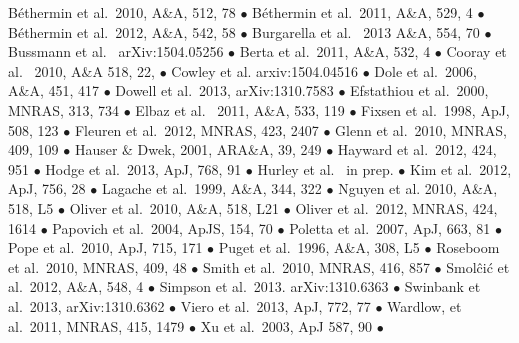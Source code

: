 \documentclass[12pt,a4paper]{article}
\begin{document}
B\'ethermin et al.\ 2010, A\&A, 512, 78 $\bullet$
B\'ethermin et al.\ 2011, A\&A, 529, 4 $\bullet$ 
B\'ethermin et al.\ 2012, A\&A, 542, 58 $\bullet$
Burgarella et al. \ 2013 A\&A, 554, 70 $\bullet$
Bussmann et al. \ arXiv:1504.05256 $\bullet$
Berta et al.\ 2011, A\&A, 532, 4 $\bullet$
Cooray et al. \ 2010, A\&A 518, 22, $\bullet$
Cowley et al. arxiv:1504.04516 $\bullet$
Dole et al.\ 2006, A\&A, 451, 417 $\bullet$
Dowell et al.\ 2013, arXiv:1310.7583 $\bullet$
Efstathiou et al.\ 2000, MNRAS, 313, 734 $\bullet$
Elbaz et al. \ 2011, A\&A, 533, 119 $\bullet$
Fixsen et al.\ 1998, ApJ, 508, 123 $\bullet$
Fleuren et al.\ 2012, MNRAS, 423, 2407 $\bullet$
Glenn et al.\ 2010, MNRAS, 409, 109 $\bullet$
Hauser \& Dwek, 2001, ARA\&A, 39, 249 $\bullet$
Hayward et al.\ 2012, 424, 951 $\bullet$
Hodge et al.\ 2013, ApJ, 768, 91 $\bullet$
Hurley et al. \ in prep. $\bullet$
Kim et al.\ 2012, ApJ, 756, 28 $\bullet$
Lagache et al.\ 1999, A\&A, 344, 322 $\bullet$
Nguyen et al. 2010, A\&A, 518, L5 $\bullet$
Oliver et al.\ 2010, A\&A, 518, L21 $\bullet$
Oliver et al.\ 2012, MNRAS, 424, 1614 $\bullet$
Papovich et al.\ 2004, ApJS, 154, 70 $\bullet$
Poletta et al.\ 2007, ApJ, 663, 81 $\bullet$
Pope et al.\ 2010, ApJ, 715, 171 $\bullet$
Puget et al.\ 1996, A\&A, 308, L5 $\bullet$
Roseboom et al.\ 2010, MNRAS, 409, 48 $\bullet$
Smith et al.\ 2010, MNRAS, 416, 857 $\bullet$
Smol\^ci\'c et al.\ 2012, A\&A, 548, 4 $\bullet$
Simpson et al.\ 2013. arXiv:1310.6363 $\bullet$
Swinbank et al.\ 2013, arXiv:1310.6362 $\bullet$
Viero et al.\ 2013, ApJ, 772, 77 $\bullet$
Wardlow, et al.\ 2011, MNRAS, 415, 1479 $\bullet$
Xu et al.\ 2003, ApJ 587, 90 $\bullet$



\end{document}
